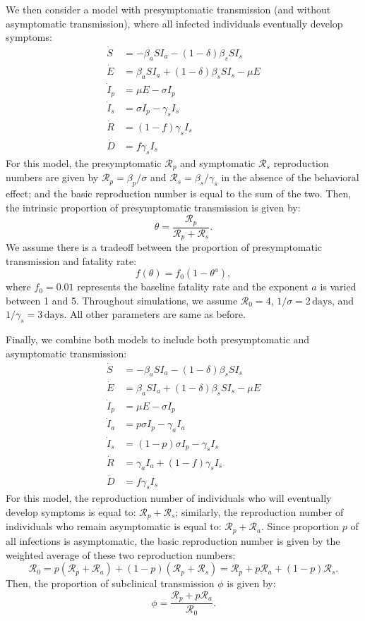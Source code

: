\documentclass[12pt]{article}
\newcommand{\RR}{\ensuremath{{\mathcal R}}\xspace}
\begin{document}
We then consider a model with presymptomatic transmission (and without asymptomatic transmission), where all infected individuals eventually develop symptoms:
\begin{align}
\dot{S} &= -\beta_a S I_a -(1-\delta) \beta_s S I_s \\
\dot{E} &= \beta_a S I_a + (1-\delta) \beta_s S I_s - \mu E\\
\dot{I}_p &= \mu E - \sigma I_p\\
\dot{I}_s &= \sigma I_p -\gamma_s I_s\\
\dot{R} &= (1-f) \gamma_s I_s \\
\dot{D} &= f \gamma_s I_s
\end{align}
For this model, the presymptomatic $\RR_p$ and symptomatic $\RR_s$ reproduction numbers are given by $\RR_p = \beta_p/\sigma$ and $\RR_s=\beta_s/\gamma_s$ in the absence of the behavioral effect; and the basic reproduction number is equal to the sum of the two.
Then, the intrinsic proportion of presymptomatic transmission is given by: 
\begin{equation}
\theta = \frac{\RR_p}{\RR_p + \RR_s}.
\end{equation}
We assume there is a tradeoff between the proportion of presymptomatic transmission and fatality rate: 
\begin{equation}
f(\theta) = f_0 (1-\theta^a),
\end{equation}
where $f_0=0.01$ represents the baseline fatality rate and the exponent $a$ is varied between 1 and 5.
Throughout simulations, we assume $\mathcal R_0 = 4$, $1/\sigma=2\,\mathrm{days}$, and $1/\gamma_s=3\,\mathrm{days}$.
All other parameters are same as before.

Finally, we combine both models to include both presymptomatic and asymptomatic transmission:
\begin{align}
\dot{S} &= -\beta_a S I_a -(1-\delta) \beta_s S I_s \\
\dot{E} &= \beta_a S I_a + (1-\delta) \beta_s S I_s - \mu E\\
\dot{I}_p &= \mu E - \sigma I_p\\
\dot{I}_a &= p \sigma I_p - \gamma_a I_a\\
\dot{I}_s &= (1-p) \sigma I_p -\gamma_s I_s\\
\dot{R} &= \gamma_a I_a + (1-f) \gamma_s I_s \\
\dot{D} &= f \gamma_s I_s
\end{align}
For this model, the reproduction number of individuals who will eventually develop symptoms is equal to: $\RR_p + \RR_s$;
similarly, the reproduction number of individuals who remain asymptomatic is equal to: $\RR_p + \RR_a$.
Since proportion $p$ of all infections is asymptomatic, the basic reproduction number is given by the weighted average of these two reproduction numbers: 
\begin{equation}
\RR_0 = p(\RR_p + \RR_a) + (1-p) (\RR_p + \RR_s) = \RR_p + p \RR_a + (1-p) \RR_s.
\end{equation}
Then, the proportion of subclinical transmission $\phi$ is given by:
\begin{equation}
\phi = \frac{\RR_p + p \RR_a}{\RR_0}.
\end{equation}
\end{document}
